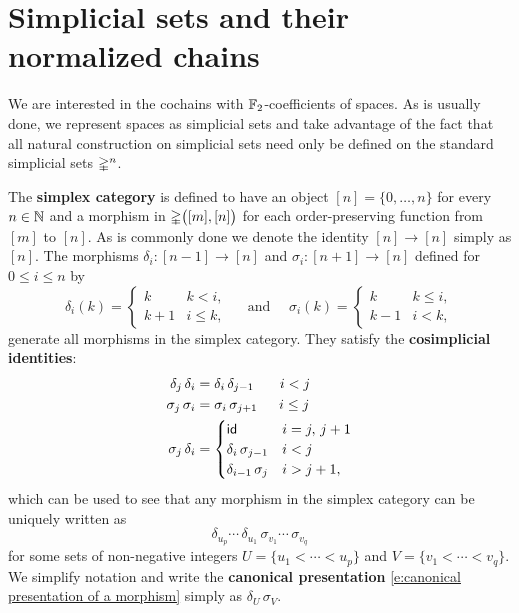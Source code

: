 
\section{Simplicial sets and their normalized chains} \label{s:preliminaries}

We are interested in the cochains with ${\mathbb{F}_2}$-coefficients of spaces.
As is usually done, we represent spaces as simplicial sets and take advantage of the fact that all natural construction on simplicial sets need only be defined on the standard simplicial sets $\mathbb{\Delta}^n$.

The \textbf{simplex category} is defined to have an object $[n] = \{0, \dots, n\}$ for every $n \in \mathbb{N}$ and a morphism in $\mathbb{\Delta} \big([m], [n] \big)$ for each order-preserving function from $[m]$ to $[n]$.
As is commonly done we denote the identity $[n] \to [n]$ simply as $[n]$.
The morphisms $\delta_i \colon [n-1] \to [n]$ and $\sigma_i \colon [n+1] \to [n]$ defined for $0 \leq i \leq n$ by
\[
\delta_i(k) =
\begin{cases} k & k < i, \\ k+1 & i \leq k, \end{cases}
\quad \text{ and } \quad
\sigma_i(k) =
\begin{cases} k & k \leq i, \\ k-1 & i < k, \end{cases}
\]
generate all morphisms in the simplex category.
They satisfy the \textbf{cosimplicial identities}:
\[
\begin{split}
\delta_j \, \delta_i &= \delta_i \, \delta_{j-1} \hspace*{18.5pt} i < j \\
\sigma_j \, \sigma_i &= \sigma_i \, \sigma_{j+1} \hspace*{15.5pt} i \leq j \\
\sigma_j \, \delta_i &=
\begin{cases}
\mathsf{id} & i = j,\, j+1 \\
\delta_i \, \sigma_{j-1} & i < j \\
\delta_{i-1} \, \sigma_{j} & i > j + 1,
\end{cases}
\end{split}
\]
which can be used to see that any morphism in the simplex category can be uniquely written as
\begin{equation} \label{e:canonical presentation of a morphism}
\delta_{u_{p}} \cdots\, \delta_{u_1}\, \sigma_{v_1} \cdots\, \sigma_{v_q}
\end{equation}
for some sets of non-negative integers $U = \{u_1 < \cdots < u_{p}\}$ and $V = \{v_1 < \cdots < v_{q}\}$.
We simplify notation and write the \textbf{canonical presentation} \eqref{e:canonical presentation of a morphism} simply as $\delta_U\, \sigma_V$.

